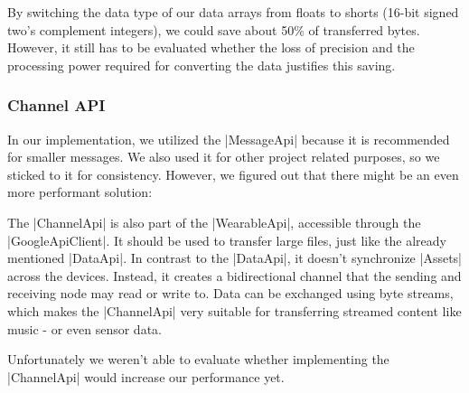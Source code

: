 By switching the data type of our data arrays from floats to shorts (16-bit signed two's complement integers), we could save about 50\% of transferred bytes. However, it still has to be evaluated whether the loss of precision and the processing power required for converting the data justifies this saving.

\subsubsection{Channel API}
In our implementation, we utilized the |MessageApi|\cite{androiddocs:messageapi} because it is recommended for smaller messages.
We also used it for other project related purposes, so we sticked to it for consistency.
However, we figured out that there might be an even more performant solution:

The |ChannelApi|\cite{androiddocs:channelapi} is also part of the |WearableApi|\cite{androiddocs:wearable}, accessible through the |GoogleApiClient|\cite{androiddocs:googleapiclient}.
It should be used to transfer large files, just like the already mentioned |DataApi|\cite{androiddocs:dataapi}.
In contrast to the |DataApi|, it doesn't synchronize |Assets|\cite{androiddocs:asset} across the devices.
Instead, it creates a bidirectional channel that the sending and receiving node may read or write to.
Data can be exchanged using byte streams, which makes the |ChannelApi| very suitable for transferring streamed content like music - or even sensor data.

Unfortunately we weren't able to evaluate whether implementing the \\|ChannelApi| would increase our performance yet.

\clearpage